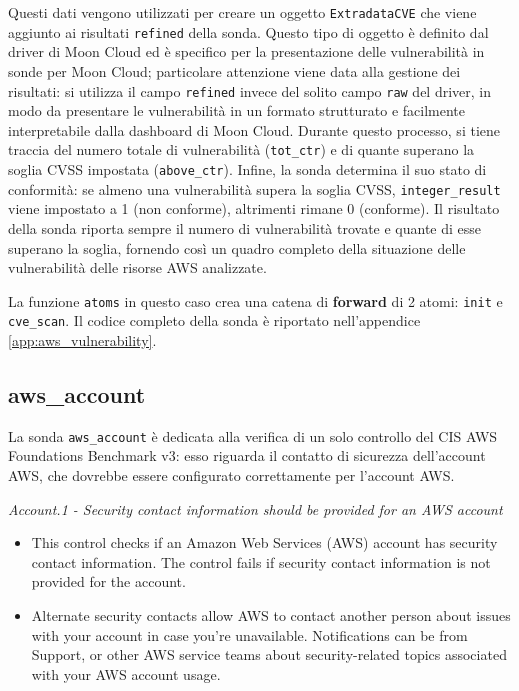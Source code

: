 Questi dati vengono utilizzati per creare un oggetto \texttt{ExtradataCVE} che viene aggiunto ai risultati \texttt{refined} della sonda. Questo tipo di oggetto è definito dal driver di Moon Cloud ed è specifico per la presentazione delle vulnerabilità in sonde per Moon Cloud; particolare attenzione viene data alla gestione dei risultati: si utilizza il campo \texttt{refined} invece del solito campo \texttt{raw} del driver, in modo da presentare le vulnerabilità in un formato strutturato e facilmente interpretabile dalla dashboard di Moon Cloud. Durante questo processo, si tiene traccia del numero totale di vulnerabilità (\texttt{tot\_ctr}) e di quante superano la soglia CVSS impostata (\texttt{above\_ctr}). Infine, la sonda determina il suo stato di conformità: se almeno una vulnerabilità supera la soglia CVSS, \texttt{integer\_result} viene impostato a 1 (non conforme), altrimenti rimane 0 (conforme). Il risultato della sonda riporta sempre il numero di vulnerabilità trovate e quante di esse superano la soglia, fornendo così un quadro completo della situazione delle vulnerabilità delle risorse AWS analizzate.

La funzione \texttt{atoms} in questo caso crea una catena di \textbf{forward} di 2 atomi: \texttt{init} e \texttt{cve\_scan}. Il codice completo della sonda è riportato nell'appendice \ref{app:aws_vulnerability}.

\subsection{aws\_account}
\label{sec:account}

La sonda \texttt{aws\_account} è dedicata alla verifica di un solo controllo del CIS AWS Foundations Benchmark v3: esso riguarda il contatto di sicurezza dell'account AWS, che dovrebbe essere configurato correttamente per l'account AWS. 

\begin{mdframed}[backgroundcolor=gray!05, linecolor=gray!50]
\itshape
Account.1 - Security contact information should be provided for an AWS account
    \begin{itemize}
        \item This control checks if an Amazon Web Services (AWS) account has security contact information. The control fails if security contact information is not provided for the account.
        \item Alternate security contacts allow AWS to contact another person about issues with your account in case you're unavailable. Notifications can be from Support, or other AWS service teams about security-related topics associated with your AWS account usage.
    \end{itemize}
\end{mdframed}

